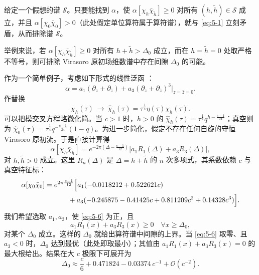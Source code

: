 给定一个假想的谱 $\mathcal{S}$。只要能找到 $\alpha$，使 $\alpha[\chi_h\bar\chi_{\tilde h}]\ge0$ 对所有 $(h,\tilde h)\in\mathcal{S}$ 成立，并且 $\alpha[\chi_0\bar\chi_0]>0$（此处假定单位算符属于算符谱），就与 \eqref{eq:5-1} 立刻矛盾，从而排除谱 $\mathcal{S}$。

举例来说，若 $\alpha[\chi_h\bar\chi_{\tilde h}]\ge0$ 对所有 $h+\tilde h>\Delta_0$ 成立，而在 $h=\tilde h=0$ 处取严格不等号，则可排除 Virasoro 原初场维数谱中存在间隙 $\Delta_0$ 的可能。

作为一个简单例子，考虑如下形式的线性泛函 \cite{r56}：
\begin{equation}
  \label{eq:5-3}
  \alpha=a_1(\partial_z+\partial_{\bar z})+a_3(\partial_z+\partial_{\bar z})^3\big|_{z=\bar z=0} .
\end{equation}
作替换
\begin{equation}
  \label{eq:5-4}
  \chi_h(\tau)\ \longrightarrow\ \hat\chi_h(\tau)=\tau^{\frac14}\eta(\tau)\chi_h(\tau).
\end{equation}
可以把模交叉方程略微化简。当 $c>1$ 时，$h>0$ 的 $\hat\chi_h(\tau)=\tau^{\frac14}q^{h-\frac{c-1}{24}}$；真空则为 $\hat\chi_0(\tau)=\tau^{\frac14}q^{-\frac{c-1}{24}}(1-q)$。为进一步简化，假定不存在任何自旋的守恒 Virasoro 原初流。于是直接计算得
\begin{equation}
  \label{eq:5-5}
  \alpha[\chi_h\bar\chi_{\tilde h}]
  =e^{-2\pi(\Delta-\frac{c-1}{12})}\bigl[a_1R_1(\Delta)+a_3R_3(\Delta)\bigr],
\end{equation}
对 $h,\tilde h>0$ 成立。这里 $R_n(\Delta)$ 是 $\Delta=h+\tilde h$ 的 $n$ 次多项式，其系数依赖 $c$ 与真空特征标：
\begin{equation}
  \label{eq:5-6}
  \begin{aligned}
  \alpha[\chi_0\bar\chi_0]={}&e^{2\pi\frac{c-1}{12}}\Bigl[a_1(-0.0118212+0.522621c)\\
  &\qquad +a_3(-0.245875-0.41425c+0.811209c^2+0.14328c^3)\Bigr].
  \end{aligned}
\end{equation}
我们希望选取 $a_1,a_3$，使 \eqref{eq:5-6} 为正，且
\begin{equation}
  \label{eq:5-7}
  a_1R_1(x)+a_3R_3(x)\ge0\quad\forall x\ge\Delta_0,
\end{equation}
对某个 $\Delta_0$ 成立。这样的 $\Delta_0$ 就给出算符谱中间隙的上界。当 \eqref{eq:5-6} 取零、且 $a_3<0$ 时，$\Delta_0$ 达到最优（此处即取最小）；其值由 $a_1R_1(x)+a_3R_3(x)=0$ 的最大根给出。结果在大 $c$ 极限下可展开为
\begin{equation}
  \label{eq:5-8}
  \Delta_0\approx\frac{c}{6}+0.471824-0.03374\,c^{-1}+\mathcal{O}(c^{-2}) .
\end{equation}

